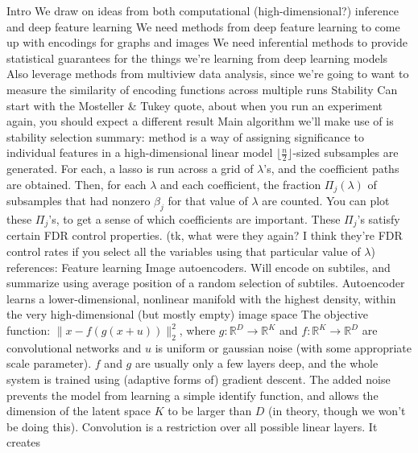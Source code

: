 \documentclass[11pt]{article}
\begin{document}
\begin{outline}
\1 Intro
  \2 We draw on ideas from both computational (high-dimensional?) inference and
  deep feature learning
    \3 We need methods from deep feature learning to come up with encodings for
    graphs and images
    \3 We need inferential methods to provide statistical guarantees for the
    things we're learning from deep learning models
  \2 Also leverage methods from multiview data analysis, since we're going to
  want to measure the similarity of encoding functions across multiple runs
\1 Stability
  \2 Can start with the Mosteller \& Tukey quote, about when you run an
  experiment again, you should expect a different result
  \2 Main algorithm we'll make use of is stability selection
    \3 summary: method is a way of assigning significance to individual features
    in a high-dimensional linear model
    \3 $\lfloor \frac{n}{2} \rfloor$-sized subsamples are generated. For each, a
    lasso is run across a grid of $\lambda$'s, and the coefficient paths are
    obtained. Then, for each $\lambda$ and each coefficient, the fraction
    $\Pi_{j}\left(\lambda\right)$ of subsamples that had nonzero $\beta_{j}$ for
    that value of $\lambda$ are counted. You can plot these $\Pi_{j}$'s, to get
    a sense of which coefficients are important.
    \3 These $\Pi_{j}$'s satisfy certain FDR control properties. (tk, what were
    they again? I think they're FDR control rates if you select all the
    variables using that particular value of $\lambda$)
  \2 references: \citep{mosteller1977data, yu2013stability, meinshausen2010stability}
\1 Feature learning
  \2 Image autoencoders. Will encode on subtiles, and summarize using average
  position of a random selection of subtiles.
    \3 Autoencoder learns a lower-dimensional, nonlinear manifold with the
    highest density, within the very high-dimensional (but mostly empty) image
    space
    \3 The objective function: $\|x - f\left(g\left(x +
    u\right)\right)\|_{2}^{2}$, where $g : \mathbb{R}^{D} \to \mathbb{R}^{K}$
    and $f: \mathbb{R}^{K} \to \mathbb{R}^{D}$ are convolutional networks and
    $u$ is uniform or gaussian noise (with some appropriate scale parameter).
    \3 $f$ and $g$ are usually only a few layers deep, and the whole system is
    trained using (adaptive forms of) gradient descent.
    \3 The added noise prevents the model from learning a simple identify
    function, and allows the dimension of the latent space $K$ to be larger than
    $D$ (in theory, though we won't be doing this).
    \3 Convolution is a restriction over all possible linear layers. It creates

\end{outline}
\end{document}
